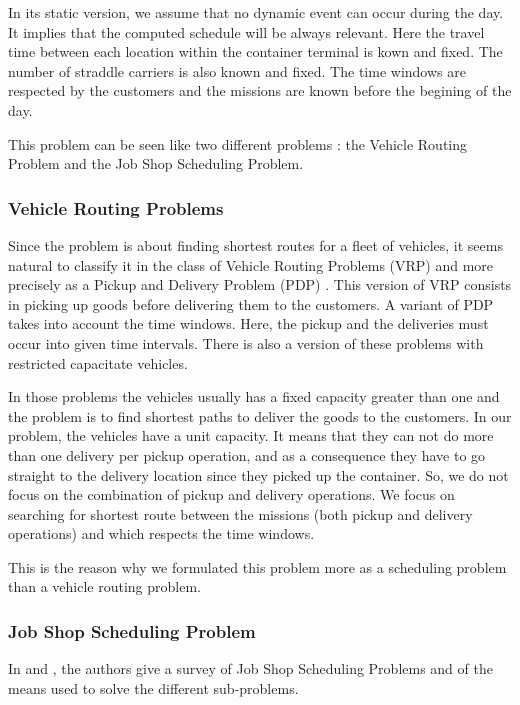 \documentclass[a4paper,10pt]{article}
\begin{document}
In its static version, we assume that no dynamic event can occur during the day. It implies that the computed schedule will be always relevant. Here the travel time between each location within the container terminal is kown and fixed. The number of straddle carriers is also known and fixed. The time windows are respected by the customers and the missions are known before the begining of the day.

This problem can be seen like two different problems : the Vehicle Routing Problem and the Job Shop Scheduling Problem.

	\subsubsection{Vehicle Routing Problems}
Since the problem is about finding shortest routes for a fleet of vehicles, it seems natural to classify it in the class of Vehicle Routing Problems (VRP)\cite{Toth2001,Laporte1992} and more precisely as a Pickup and Delivery Problem (PDP) \cite{Berbeglia2007}. This version of VRP consists in picking up goods before delivering them to the customers. A variant of PDP takes into account the time windows\cite{Mitrovic1998}. Here, the pickup and the deliveries must occur into given time intervals. There is also a version of these problems with restricted capacitate vehicles\cite{Toth2001}.

In those problems the vehicles usually has a fixed capacity greater than one and the problem is to find shortest paths to deliver the goods to the customers. In our problem, the vehicles have a unit capacity. It means that they can not do more than one delivery per pickup operation, and as a consequence they have to go straight to the delivery location since they picked up the container. So, we do not focus on the combination of pickup and delivery operations. We focus on searching for shortest route between the missions (both pickup and delivery operations) and which respects the time windows.

This is the reason why we formulated this problem more as a scheduling problem than a vehicle routing problem.

	\subsubsection{Job Shop Scheduling Problem}
In \cite{Jain1999} and \cite{Brucker2010}, the authors give a survey of Job Shop Scheduling Problems and of the means used to solve the different sub-problems.
  
\end{document}
